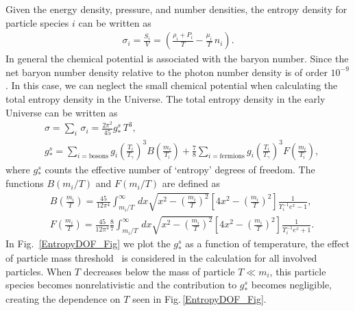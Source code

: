 Given the energy density, pressure, and number densities, the entropy density for particle species $i$ can be written as 
\begin{align}\label{entropy}
\sigma_i=\frac{S_i}{V}=\left(\frac{\rho_i+P_i}{T}-\frac{\mu_i}{T}\,n_i\right).
\end{align}
In general the chemical potential is associated with the baryon number. Since the net baryon number density relative to the photon number density is of order $10^{-9}$. In this case, we can neglect the small chemical potential when calculating the total entropy density in the Universe. The total entropy density in the early Universe can be written as
\begin{align}
&\sigma=\sum_i\,\sigma_i=\frac{2\pi^2}{45}g^s_\ast\,T^3,\\
&g^s_\ast=\sum_{i=\mathrm{bosons}}g_i\left({\frac{T_i}{T_\gamma}}\right)^3B\left(\frac{m_i}{T_i}\right)+\frac{7}{8}\sum_{i=\mathrm{fermions}}g_i\left({\frac{T_i}{T_\gamma}}\right)^3F\left(\frac{m_i}{T_i}\right),
\end{align}
where $g^s_\ast$ counts the effective number of `entropy' degrees of freedom. The functions $B(m_i/T)$ and $F(m_i/T)$ are defined as 
\begin{align}
&B\left(\frac{m_i}{T}\right)=\frac{45}{12\pi^4}\int^\infty_{m_i/T}\,dx\sqrt{x^2-\left(\frac{m_i}{T}\right)^2}\left[4x^2-\left(\frac{m_i}{T}\right)^2\right]\frac{1}{\Upsilon^{-1}_ie^x-1},\\
&F\left(\frac{m_i}{T}\right)=\frac{45}{12\pi^4}\frac{8}{7}\int^\infty_{m_i/T}\,dx\sqrt{x^2-\left(\frac{m_i}{T}\right)^2}\left[4x^2-\left(\frac{m_i}{T}\right)^2\right]\frac{1}{\Upsilon^{-1}_ie^x+1}.
\end{align}
In Fig.~\ref{EntropyDOF_Fig} we plot the $g^s_\ast$ as a function of temperature, the effect of particle mass threshold~\cite{Coc:2006rt} is considered in the calculation for all involved particles. When $T$ decreases below the mass of particle $T\ll m_i$, this particle species becomes nonrelativistic and the contribution to $g^s_\ast$ becomes negligible, creating the dependence on $T$ seen in Fig.\,\ref{EntropyDOF_Fig}.

